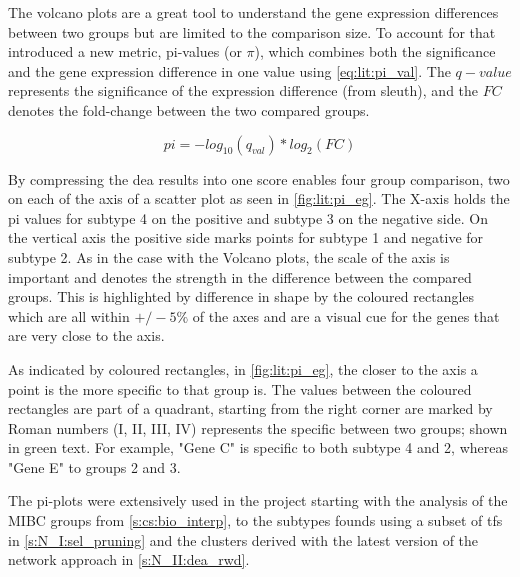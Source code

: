 The volcano plots are a great tool to understand the gene expression differences between two groups but are limited to the comparison size. To account for that \cite{Xiao2014-zn} introduced a new metric, pi-values (or $\pi$), which combines both the significance and the gene expression difference in one value using \cref{eq:lit:pi_val}. The $q-value$ represents the significance of the expression difference (from sleuth), and the $FC$ denotes the fold-change between the two compared groups. 

\begin{equation} \label{eq:lit:pi_val}
    pi = - log_{10}(q_{val}) * log_{2}(FC)
\end{equation} 

By compressing the \acrshort{dea} results into one score enables four group comparison, two on each of the axis of a scatter plot as seen in \cref{fig:lit:pi_eg}. The X-axis holds the pi values for subtype 4 on the positive and subtype 3 on the negative side. On the vertical axis the positive side marks points for subtype 1 and negative for subtype 2. As in the case with the Volcano plots, the scale of the axis is important and denotes the strength in the difference between the compared groups. This is highlighted by difference in shape by the coloured rectangles which are all within $+/-5\%$ of the axes and are a visual cue for the genes that are very close to the axis.

As indicated by coloured rectangles, in \cref{fig:lit:pi_eg}, the closer to the axis a point is the more specific to that group is. The values between the coloured rectangles are part of a quadrant, starting from the right corner are marked by Roman numbers (I, II, III, IV) represents the specific between two groups; shown in green text. For example, "Gene C" is specific to both subtype 4 and 2, whereas "Gene E" to groups 2 and 3. 

The pi-plots were extensively used in the project starting with the analysis of the MIBC groups from \cref{s:cs:bio_interp}, to the subtypes founds using a subset of \acrlong{tf}s in \cref{s:N_I:sel_pruning} and the clusters derived with the latest version of the network approach in \cref{s:N_II:dea_rwd}.

